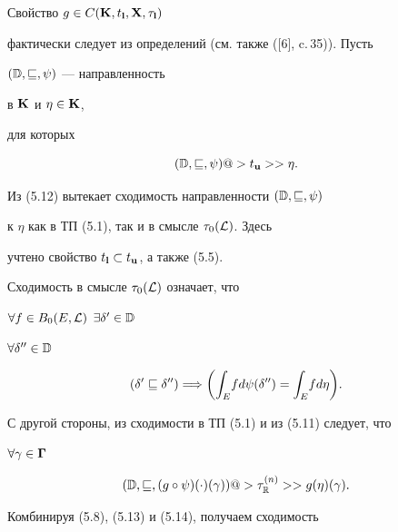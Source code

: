 \begin{pf}


Свойство $g \in C({\bold K},{t_{\bold l}},{\bold X},{{\tau}_{\bold l}})$


фактически следует из определений (см. также ([6], c.\,35)). Пусть


$({\Bbb D},\sqsubseteq,\psi)$ --- направленность


в ${\bold K}$ и $\eta \in {\bold K}$,


для которых


\begin{equation}


({\Bbb D},\sqsubseteq,\psi) @>{t_{\bold u}}>> \eta.


\end{equation}


Из (5.12) вытекает сходимость направленности $({\Bbb D},\sqsubseteq,\psi)$


к $\eta$ как в ТП (5.1), так и в смысле ${{\tau}_0}({\cal L})$. Здесь


учтено свойство ${t_{\bold l}} \subset {t_{\bold u}}$, а также (5.5).


Сходимость в смысле ${{\tau}_0}({\cal L})$ означает, что


$\forall{f} \in {B_0}(E,{\cal L})$ $\exists{{\delta}'} \in {\Bbb D}$


$\forall{{\delta}''} \in {\Bbb D}$


\begin{equation}


({{\delta}'} \sqsubseteq {{\delta}''})


\Lo \bigg({\int_E}f{d{\psi}({\delta}'')} = {\int_E}f{d\eta}\bigg).


\end{equation}





С другой стороны, из сходимости в ТП (5.1) и из (5.11) следует, что


$\forall{\gamma} \in \boldsymbol \Gamma$


\begin{equation}


({\Bbb D},\sqsubseteq,


(g \circ \psi)(\cdot)(\gamma)) @>{{\tau}_{\Bbb R}^{(n)}}>>


g(\eta)(\gamma).


\end{equation}


Комбинируя (5.8), (5.13) и (5.14), получаем сходимость



\end{pf}
